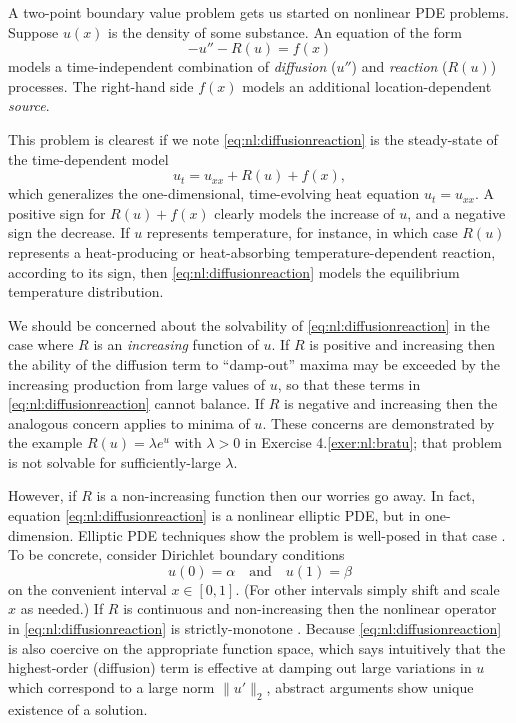 A two-point boundary value problem gets us started on nonlinear PDE problems.  Suppose $u(x)$ is the density of some substance.  An equation of the form
\begin{equation}
- u'' - R(u) = f(x)  \label{eq:nl:diffusionreaction}
\end{equation}
models a time-independent combination of \emph{diffusion} ($u''$) and \emph{reaction} ($R(u)$) processes.  The right-hand side $f(x)$ models an additional location-dependent \emph{source}.

This problem is clearest if we note \eqref{eq:nl:diffusionreaction} is the steady-state of the time-dependent model
\begin{equation}
u_t = u_{xx} + R(u) + f(x),  \label{eq:nl:drtimedependent}
\end{equation}
which generalizes the one-dimensional, time-evolving heat equation $u_t = u_{xx}$.  A positive sign for $R(u)+f(x)$ clearly models the increase of $u$, and a negative sign the decrease.  If $u$ represents temperature, for instance, in which case $R(u)$ represents a heat-producing or heat-absorbing temperature-dependent reaction, according to its sign, then \eqref{eq:nl:diffusionreaction} models the equilibrium temperature distribution.

We should be concerned about the solvability of \eqref{eq:nl:diffusionreaction} in the case where $R$ is an \emph{increasing} function of $u$.  If $R$ is positive and increasing then the ability of the diffusion term to ``damp-out'' maxima may be exceeded by the increasing production from large values of $u$, so that these terms in \eqref{eq:nl:diffusionreaction} cannot balance.  If $R$ is negative and increasing then the analogous concern applies to minima of $u$.  These concerns are demonstrated by the example $R(u) = \lambda e^u$ with $\lambda>0$ in Exercise 4.\ref{exer:nl:bratu}; that problem is not solvable for sufficiently-large $\lambda$.

However, if $R$ is a non-increasing function then our worries go away.  In fact, equation \eqref{eq:nl:diffusionreaction} is a nonlinear elliptic PDE, but in one-dimension.  Elliptic PDE techniques show the problem is well-posed in that case \citep[pages 93-94]{KinderlehrerStampacchia1980}.  To be concrete, consider Dirichlet boundary conditions
\begin{equation}
u(0)=\alpha \quad \text{and} \quad u(1)=\beta  \label{eq:nl:drbcs}
\end{equation}
on the convenient interval $x\in[0,1]$.  (For other intervals simply shift and scale $x$ as needed.)  If $R$ is continuous and non-increasing then the nonlinear operator in \eqref{eq:nl:diffusionreaction} is strictly-monotone \citep[page 83]{KinderlehrerStampacchia1980}.  Because \eqref{eq:nl:diffusionreaction} is also coercive on the appropriate function space, which says intuitively that the highest-order (diffusion) term is effective at damping out large variations in $u$ which correspond to a large norm $\|u'\|_2$, abstract arguments show unique existence of a solution.

